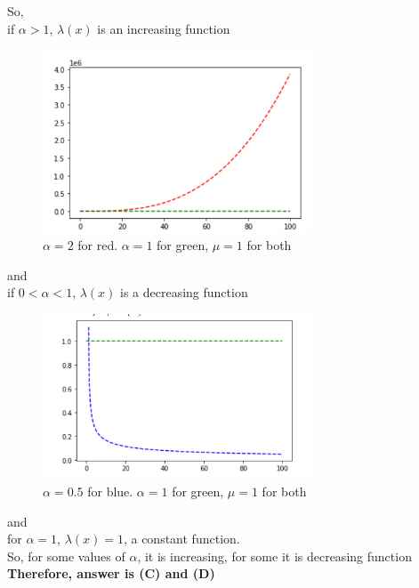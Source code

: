 \documentclass[journal,12pt,twocolumn]{IEEEtran}
\begin{document}
So,\\ if $\alpha>1$, $\lambda(x)$ is an increasing function
\begin{figure}[htp]
    \centering
    \includegraphics[width=8cm]{alphagrt1.png}
    \caption{$\alpha=2$ for red. $\alpha=1$ for green, $\mu=1$ for both}
    \label{fig:grt1}
\end{figure}
and\\ if $0<\alpha<1$, $\lambda(x)$ is a decreasing function
\begin{figure}[htp]
    \centering
    \includegraphics[width=8cm]{alphales1.png}
    \caption{$\alpha=0.5$ for blue. $\alpha=1$ for green, $\mu=1$ for both}
    \label{fig:les1}
\end{figure}
and\\ for $\alpha=1$, $\lambda(x)=1$, a constant function.\\
So, for some values of $\alpha$, it is increasing, for some it is decreasing function\\
\textbf{Therefore, answer is (C) and (D)}
\end{document}

